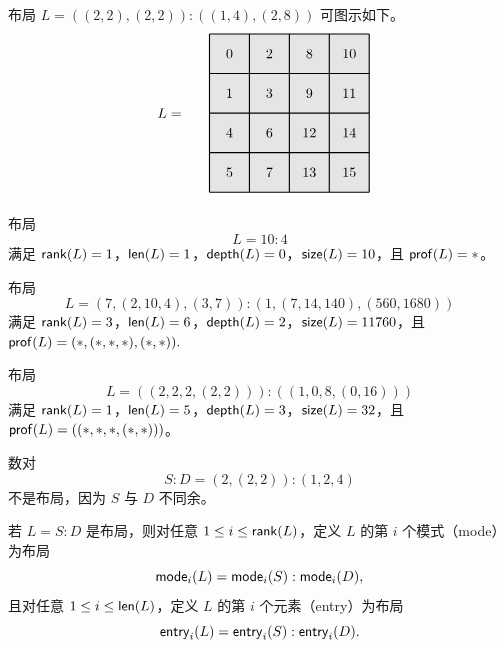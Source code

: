 \begin{example} 布局 $L = ((2,2),(2,2)):((1,4),(2,8))$ 可图示如下。
\[
\begin{tikzpicture}[x={(0cm,-1cm)},y={(1cm,0cm)},every node/.style={minimum size=1cm, outer sep=0pt}]

\node[fill=gray!20] at (0,0) {0};
\node[fill=gray!20] at (0,1) {2};
\node[fill=gray!20] at (0,2) {8};
\node[fill=gray!20] at (0,3) {10};
\node[fill=gray!20] at (1,0) {1};
\node[fill=gray!20] at (1,1) {3};
\node[fill=gray!20] at (1,2) {9};
\node[fill=gray!20] at (1,3) {11};
\node[fill=gray!20] at (2,0) {4};
\node[fill=gray!20] at (2,1) {6};
\node[fill=gray!20] at (2,2) {12};
\node[fill=gray!20] at (2,3) {14};
\node[fill=gray!20] at (3,0) {5};
\node[fill=gray!20] at (3,1) {7};
\node[fill=gray!20] at (3,2) {13};
\node[fill=gray!20] at (3,3) {15};
\draw[color=black,thick,shift={(-0.5,-0.5)}] (0,0) grid (4,4);

\node[anchor = east] at (1.5,-1) {$L = $};
\end{tikzpicture}
\]
\end{example}


\begin{example}
    布局
    \[
    L = 10:4
    \]
    满足 $\mathsf{rank}(L) = 1$，$\mathsf{len}(L) = 1$，$\mathsf{depth}(L) = 0$，$\mathsf{size}(L) = 10$，且 $\mathsf{prof}(L) = *$。
\end{example}

\begin{example}
    布局
    \[
    L = (7,(2,10,4),(3,7)) : (1,(7,14,140),(560,1680))
    \]
    满足 $\mathsf{rank}(L) = 3$，$\mathsf{len}(L) = 6$，$\mathsf{depth}(L) = 2$，$\mathsf{size}(L) = 11760$，且 $\mathsf{prof}(L) = (*,(*,*,*),(*,*)).$
\end{example}

\begin{example}
    布局
    \[
    L = ((2,2,2,(2,2))) : ((1,0,8,(0,16)))
    \]
    满足 $\mathsf{rank}(L)= 1$，$\mathsf{len}(L) = 5$，$\mathsf{depth}(L) = 3$，$\mathsf{size}(L) = 32$，且 $\mathsf{prof}(L) = ((*,*,*,(*,*)))$。
\end{example}

\begin{example}
    数对
    \[
    S:D = (2,(2,2)):(1,2,4)
    \]
    不是布局，因为 $S$ 与 $D$ 不同余。
\end{example}

\begin{definition}
    若 $L = S:D$ 是布局，则对任意 $1 \leq i \leq \mathsf{rank}(L)$，定义 $L$ 的第 $i$ 个模式（mode）为布局
    \[
    \mathsf{mode}_i(L) = \mathsf{mode}_i(S) : \mathsf{mode}_i(D),
    \]
    且对任意 $1 \leq i \leq \mathsf{len}(L)$，定义 $L$ 的第 $i$ 个元素（entry）为布局
    \[
    \mathsf{entry}_i(L) = \mathsf{entry}_i(S) : \mathsf{entry}_i(D).
    \]
\end{definition}

